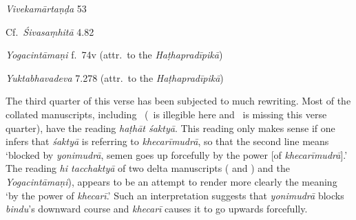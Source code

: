 \begin{ekdosis}
\begin{sources}[hp03_040]
\emph{Vivekamārtaṇḍa} 53
\begin{versinnote}

\tl{\var{53c gacchaty ] vrajaty \vl 53d hataḥ ] tanaṃ, hṛtas, kṛte, kṛtaḥ, tadā, gatā \vl • nibaddho ] niruddho \vl}\\!}
\end{versinnote}

Cf.~\emph{Śivasaṃhitā} 4.82
\begin{versinnote}
\end{versinnote}
\end{sources}

\begin{testimonia}[hp03_040]
\emph{Yogacintāmaṇi} f.~74v (attr.~to the \emph{Haṭhapradīpikā})
\begin{versinnote}
\end{versinnote}

\emph{Yuktabhavadeva} 7.278 (attr.~to the \emph{Haṭhapradīpikā})
\begin{versinnote}
\end{versinnote}
\end{testimonia}

\begin{philcomm}[hp03_040]

The third quarter of this verse has been subjected to much rewriting. Most of the collated manuscripts, including \alphaTwo\ (\alphaOne\ is illegible here and \alphaThree\ is missing this verse quarter), have the reading \emph{haṭhāt śaktyā}. This reading only makes sense if one infers that \emph{śaktyā} is referring to \emph{khecarīmudrā}, so that the second line means `blocked by \emph{yonimudrā}, semen goes up forcefully by the power [of \emph{khecarīmudrā}].' The reading \emph{hi tacchaktyā} of two delta manuscripts ( and ) and the \emph{Yogacintāmaṇi}), appears to be an attempt to render more clearly the meaning `by the power of \emph{khecarī}.' Such an interpretation suggests that \emph{yonimudrā} blocks \emph{bindu}'s downward course and \emph{khecarī} causes it to go upwards forcefully.


\end{philcomm}
\end{ekdosis}
